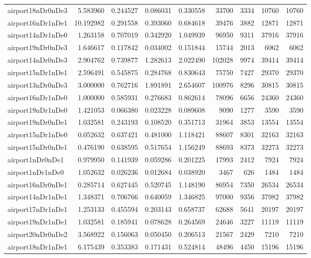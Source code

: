 \begin{longtable}{|l|r|r|r|r|r|r|r|r|}
airport18nDr0nDe3 & 5.583960 & 0.244527 & 0.086031 & 0.330558 & 33700 & 3334 & 10760 & 10760 \\
airport16nDr1nDe1 & 10.192982 & 0.291558 & 0.393060 & 0.684618 & 39476 & 3882 & 12871 & 12871 \\
airport14nDr1nDe0 & 1.263158 & 0.707019 & 0.342920 & 1.049939 & 96950 & 9311 & 37916 & 37916 \\
airport19nDr0nDe3 & 1.646617 & 0.117842 & 0.034002 & 0.151844 & 15744 & 2013 & 6062 & 6062 \\
airport14nDr0nDe3 & 2.904762 & 0.739877 & 1.282613 & 2.022490 & 102028 & 9974 & 39414 & 39414 \\
airport15nDr1nDe1 & 2.596491 & 0.545875 & 0.284768 & 0.830643 & 75750 & 7427 & 29370 & 29370 \\
airport13nDr0nDe3 & 3.000000 & 0.762716 & 1.891891 & 2.654607 & 100976 & 8296 & 30815 & 30815 \\
airport16nDr1nDe0 & 1.000000 & 0.585931 & 0.276683 & 0.862614 & 78096 & 6656 & 24360 & 24360 \\
airport19nDr1nDe0 & 1.421053 & 0.066380 & 0.023228 & 0.089608 & 9090 & 1277 & 3590 & 3590 \\
airport19nDr0nDe1 & 1.032581 & 0.243193 & 0.108520 & 0.351713 & 31964 & 3853 & 13554 & 13554 \\
airport15nDr1nDe0 & 0.052632 & 0.637421 & 0.481000 & 1.118421 & 88607 & 8301 & 32163 & 32163 \\
airport15nDr0nDe1 & 0.476190 & 0.638595 & 0.517654 & 1.156249 & 88693 & 8373 & 32273 & 32273 \\
airport1nDr0nDe1 & 0.979950 & 0.141939 & 0.059286 & 0.201225 & 17993 & 2412 & 7924 & 7924 \\
airport1nDr1nDe0 & 1.052632 & 0.026236 & 0.012684 & 0.038920 & 3467 & 626 & 1484 & 1484 \\
airport16nDr0nDe1 & 0.285714 & 0.627445 & 0.520745 & 1.148190 & 86954 & 7350 & 26534 & 26534 \\
airport14nDr1nDe1 & 1.348371 & 0.706766 & 0.640059 & 1.346825 & 97000 & 9356 & 37982 & 37982 \\
airport17nDr1nDe1 & 1.253133 & 0.455594 & 0.203143 & 0.658737 & 62688 & 5641 & 20197 & 20197 \\
airport19nDr1nDe1 & 1.032581 & 0.185941 & 0.078628 & 0.264569 & 24646 & 3227 & 11119 & 11119 \\
airport20nDr0nDe2 & 3.568922 & 0.156063 & 0.050450 & 0.206513 & 21567 & 2429 & 7210 & 7210 \\
airport18nDr1nDe1 & 6.175439 & 0.353383 & 0.171431 & 0.524814 & 48496 & 4450 & 15196 & 15196 \\

\end{longtable}
